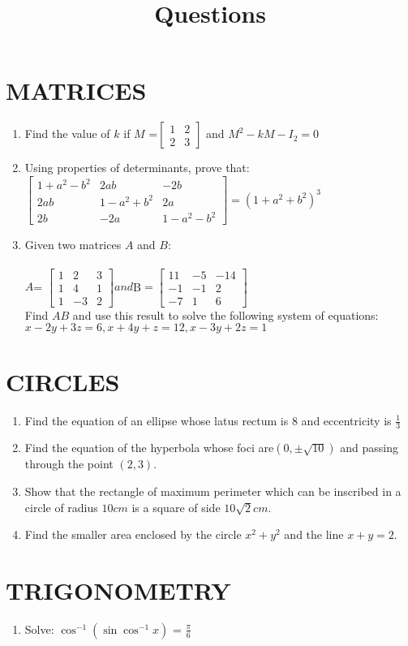 \documentclass[12pt]{article}
\providecommand{\myvec}[1]{\ensuremath{\begin{bmatrix}#1\end{bmatrix}}}
\begin{document}
\section{MATRICES}
\begin{enumerate}
	\item Find the value of $ k $ if $M$ =$ \myvec {1 & 2 \\ 2 & 3 }$  and     $M^2 - kM - I_2 = 0 $
\item Using properties of determinants, prove that:\\

	$ \myvec  {1 + a^2 - b^2 & 2ab & -2b \\ 
 2ab & 1 - a^2 + b^2 & 2a \\
 2b & -2a & 1 - a^2 - b^2}
 = (1 + a^2 + b^2)^3 $
\item  Given two matrices $A$ and $B$:\\
\\
		$A$= \myvec{ 1 & 2 & 3 \\
1 & 4 & 1 \\
		1 & -3 &2}$ and $B$ = \myvec{ 11 & -5 & -14 \\
		-1 & -1 & 2 \\
		-7 & 1 & 6 }$\\

		Find $AB$ and use this result to solve the following system of equations:\\
$x - 2y + 3z = 6,	x + 4y + z = 12,	x - 3y + 2z = 1$
\end{enumerate}
		\section{CIRCLES}
		\begin{enumerate}
			\item Find the equation of an ellipse whose latus rectum is $8$ and eccentricity is $\frac {1}{3}$
			\item Find the equation of the hyperbola whose foci are$(0, \pm \sqrt{10})$ and passing through the point $(2, 3)$.
			\item Show that the rectangle of maximum perimeter which can be inscribed in a circle of radius $10 cm$ is a square of side $10\sqrt{2} cm$.
			\item Find the smaller area enclosed by the circle $x^2 + y^2$ and the line $x + y = 2$.
		\end{enumerate}
		\section{TRIGONOMETRY}
		\title{Questions}
		\begin{enumerate}
			\item Solve: $\cos^{-1}(\sin\cos^{-1} x)$ = $\frac{\pi}{6} $
		\end{enumerate}
\end{document}
